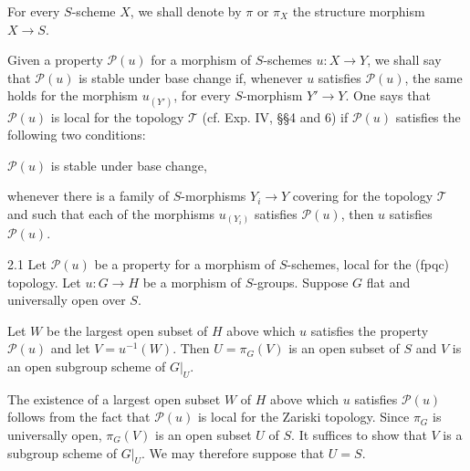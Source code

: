 For every $S$-scheme $X$, we shall denote by $\pi$ or $\pi_X$ the structure morphism $X\to S$.

Given a property $\mathscr P(u)$ for a morphism of $S$-schemes $u:X\to Y$, we shall say that $\mathscr P(u)$ is stable under base change if, whenever $u$ satisfies $\mathscr P(u)$, the same holds for the morphism $u_{(Y')}$, for every $S$-morphism $Y'\to Y$. One says that $\mathscr P(u)$ is local for the topology $\mathcal T$ (cf. Exp. IV, §§4 and 6) if $\mathscr P(u)$ satisfies the following two conditions:
\begin{enumeratea}
\item $\mathscr P(u)$ is stable under base change,
\item whenever there is a family of $S$-morphisms $Y_i\to Y$ covering for the topology $\mathcal T$ and such that each of the morphisms $u_{(Y_i)}$ satisfies $\mathscr P(u)$, then $u$ satisfies $\mathscr P(u)$.
\end{enumeratea}
\begin{proposition}{2.1}\label{VIB.2.1}
Let $\mathscr P(u)$ be a property for a morphism of $S$-schemes, local for the (fpqc) topology. Let $u:G\to H$ be a morphism of $S$-groups. Suppose $G$ flat and universally open over $S$.

Let $W$ be the largest open subset of $H$ above which $u$ satisfies the property $\mathscr P(u)$ and let $V=u^{-1}(W)$. Then $U=\pi_G(V)$ is an open subset of $S$ and $V$ is an open subgroup scheme of $G|_U$.
\end{proposition}
The existence of a largest open subset $W$ of $H$ above which $u$ satisfies $\mathscr P(u)$ follows from the fact that $\mathscr P(u)$ is local for the Zariski topology. Since $\pi_G$ is universally open, $\pi_G(V)$ is an open subset $U$ of $S$. It suffices to show that $V$ is a subgroup scheme of $G|_U$. We may therefore suppose that $U=S$.

